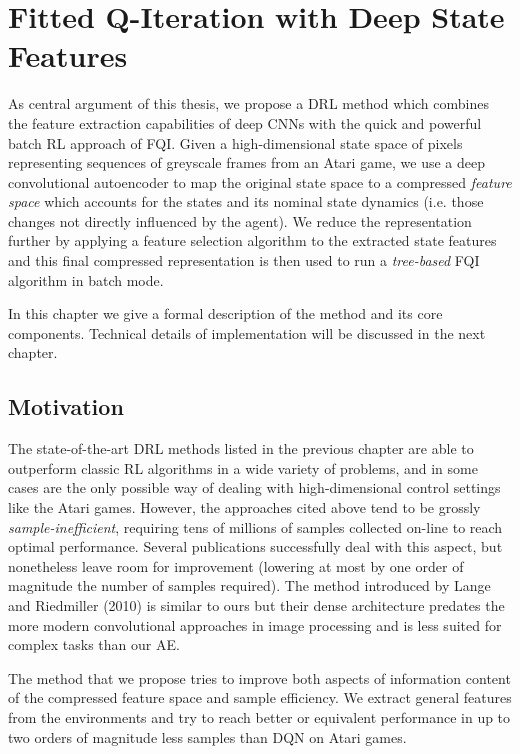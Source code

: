 \chapter{Fitted Q-Iteration with Deep State Features}
\label{ch3_setup}
\thispagestyle{empty}

\vspace{0.5cm}

As central argument of this thesis, we propose a DRL method which 
combines the feature extraction capabilities of deep CNNs with the quick 
and powerful batch RL approach of FQI. 
Given a high-dimensional state space of pixels representing sequences of 
greyscale frames from an Atari game, we use a deep convolutional autoencoder 
to map the original state space to a compressed \textit{feature space} which 
accounts for the states and its nominal state dynamics (i.e. those changes not
directly influenced by the agent). We reduce the representation further by 
applying a feature selection algorithm to the extracted state features and this 
final compressed representation is then used to run a \textit{tree-based} FQI 
algorithm in batch mode.

In this chapter we give a formal description of the method and its core 
components. Technical details of implementation will be discussed in the next
chapter.

\section{Motivation}
The state-of-the-art DRL methods listed in the previous chapter are able to 
outperform classic RL algorithms in a wide variety of problems, and in some 
cases are the only possible way of dealing with high-dimensional control 
settings like the Atari games. 
However, the approaches cited above tend to be grossly 
\textit{sample-inefficient}, requiring tens of millions of samples collected
on-line to reach optimal performance. Several publications successfully deal 
with this aspect, but nonetheless leave room for improvement (lowering at most
by one order of magnitude the number of samples required).
The method introduced by Lange and Riedmiller (2010) \cite{lange2010deep} is 
similar to ours but their dense architecture predates the more modern 
convolutional approaches in image processing and is less suited for complex
tasks than our AE.

The method that we propose tries to improve both aspects of information content
of the compressed feature space and sample efficiency. We extract general 
features from the environments and try to reach better or equivalent performance
in up to two orders of magnitude less samples than DQN on Atari games.

